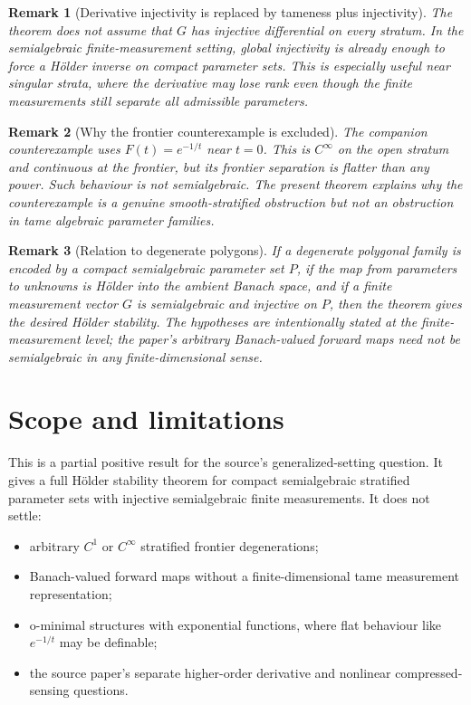 \documentclass[11pt]{article}
\newtheorem{remark}{Remark}
\begin{document}
\begin{remark}[Derivative injectivity is replaced by tameness plus injectivity]
The theorem does not assume that \(G\) has injective differential on every
stratum.  In the semialgebraic finite-measurement setting, global injectivity is
already enough to force a H\"older inverse on compact parameter sets.  This is
especially useful near singular strata, where the derivative may lose rank even
though the finite measurements still separate all admissible parameters.
\end{remark}

\begin{remark}[Why the frontier counterexample is excluded]
The companion counterexample uses \(F(t)=e^{-1/t}\) near \(t=0\).  This is
\(C^\infty\) on the open stratum and continuous at the frontier, but its
frontier separation is flatter than any power.  Such behaviour is not
semialgebraic.  The present theorem explains why the counterexample is a
genuine smooth-stratified obstruction but not an obstruction in tame algebraic
parameter families.
\end{remark}

\begin{remark}[Relation to degenerate polygons]
If a degenerate polygonal family is encoded by a compact semialgebraic
parameter set \(P\), if the map from parameters to unknowns is H\"older into the
ambient Banach space, and if a finite measurement vector \(G\) is semialgebraic
and injective on \(P\), then the theorem gives the desired H\"older stability.
The hypotheses are intentionally stated at the finite-measurement level; the
paper's arbitrary Banach-valued forward maps need not be semialgebraic in any
finite-dimensional sense.
\end{remark}

\section{Scope and limitations}

This is a partial positive result for the source's generalized-setting
question.  It gives a full H\"older stability theorem for compact
semialgebraic stratified parameter sets with injective semialgebraic finite
measurements.  It does not settle:
\begin{itemize}
\item arbitrary \(C^1\) or \(C^\infty\) stratified frontier degenerations;
\item Banach-valued forward maps without a finite-dimensional tame measurement
  representation;
\item o-minimal structures with exponential functions, where flat behaviour
  like \(e^{-1/t}\) may be definable;
\item the source paper's separate higher-order derivative and nonlinear
  compressed-sensing questions.
\end{itemize}
\end{document}
